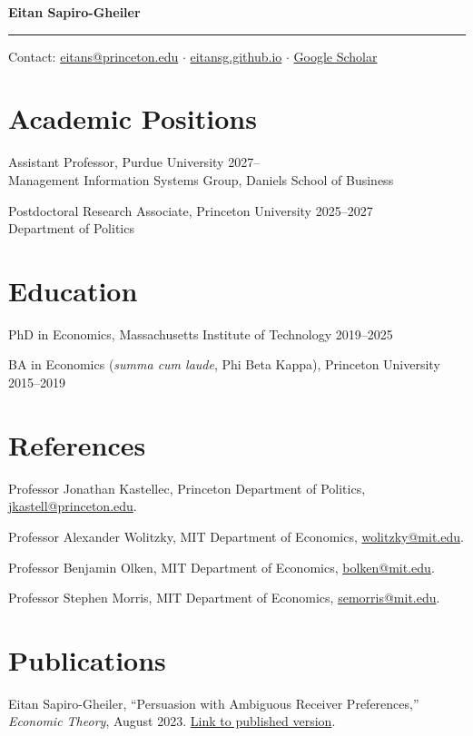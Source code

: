 \documentclass[11pt,reqno]{amsart}
\begin{document}

\Large
\textbf{Eitan Sapiro-Gheiler}
\vspace{0.25cm}
\hrule
\vspace{0.3cm}

\normalsize

Contact: \href{mailto:eitans@princeton.edu}{eitans@princeton.edu} \quad $\cdot$ \quad \href{https://eitansg.github.io}{eitansg.github.io} \quad $\cdot$ \quad \href{https://scholar.google.com/citations?user=eIXUMmwAAAAJ&hl=en}{Google Scholar}

\section*{Academic Positions}
Assistant Professor, Purdue University \hfill 2027--\\
Management Information Systems Group, Daniels School of Business

Postdoctoral Research Associate, Princeton University \hfill 2025--2027\\
Department of Politics

\section*{Education}
PhD in Economics, Massachusetts Institute of Technology \hfill 2019--2025

BA in Economics (\textit{summa cum laude}, Phi Beta Kappa), Princeton University \hfill 2015--2019

\section*{References}
Professor Jonathan Kastellec, Princeton Department of Politics, \href{mailto:jkastell@princeton.edu}{jkastell@princeton.edu}.

Professor Alexander Wolitzky, MIT Department of Economics, \href{mailto:wolitzky@mit.edu}{wolitzky@mit.edu}.

Professor Benjamin Olken, MIT Department of Economics, \href{mailto:bolken@mit.edu}{bolken@mit.edu}.

Professor Stephen Morris, MIT Department of Economics, \href{mailto:semorris@mit.edu}{semorris@mit.edu}.

\section*{Publications}
Eitan Sapiro-Gheiler, ``Persuasion with Ambiguous Receiver Preferences,'' \textit{Economic Theory}, August 2023. \href{https://doi.org/10.1007/s00199-023-01522-z}{Link to published version}.
\end{document}
